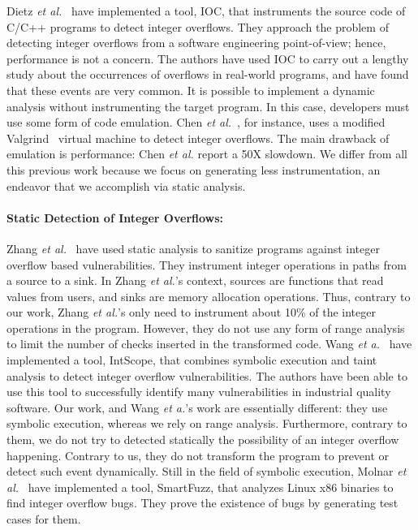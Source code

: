\documentclass[preprint]{sigplanconf}[10pt]
\begin{document}
Dietz {\em et al.}~\cite{Dietz12} have 
implemented a tool, IOC, that instruments the source code of C/C++ programs to
detect integer overflows.
They approach the problem of detecting integer overflows from a software
engineering point-of-view; hence, performance is not a concern.
The authors have used IOC to carry out a lengthy study about the occurrences
of overflows in real-world programs, and have found that these events are very
common.
It is possible to implement a dynamic analysis without instrumenting the
target program.
In this case, developers must use some form of code emulation.
Chen {\em et al.}~\cite{Chen09}, for instance, uses a modified
Valgrind~\cite{Nethercote07} virtual machine to detect integer overflows.
The main drawback of emulation is performance: Chen {\em et al.} report a
50X slowdown.
We differ from all this previous work because we focus on generating less
instrumentation, an endeavor that we accomplish via static analysis.

\paragraph{Static Detection of Integer Overflows: }
Zhang {\em et al.}~\cite{Zhang09} have used static analysis to sanitize
programs against integer overflow based vulnerabilities.
They instrument integer operations in paths from a source to a sink.
In Zhang {\em et al.}'s context, sources are functions that read values from
users, and sinks are memory allocation operations.
Thus, contrary to our work, Zhang {\em et al.}'s only need to instrument
about 10\% of the integer operations in the program.
However, they do not use any form of range analysis to limit the number of
checks inserted in the transformed code.
Wang {\em et a.}~\cite{Wang09} have implemented a tool, IntScope, that combines symbolic execution and taint analysis to detect integer overflow vulnerabilities. The authors have been able to use this tool to successfully identify many vulnerabilities in industrial quality software. Our work, and Wang {\em et a.}'s work are essentially different: they use symbolic execution, whereas we rely on
range analysis.
Furthermore, contrary to them, we do not try to detected statically the
possibility of an integer overflow happening.
Contrary to us, they do not transform the program to prevent or detect such event dynamically.
Still in the field of symbolic execution, Molnar
{\em et al.}~\cite{Molnar09} have implemented a tool, SmartFuzz, that analyzes
Linux x86 binaries to find integer overflow bugs.
They prove the existence of bugs by generating test cases for them.
\end{document}
